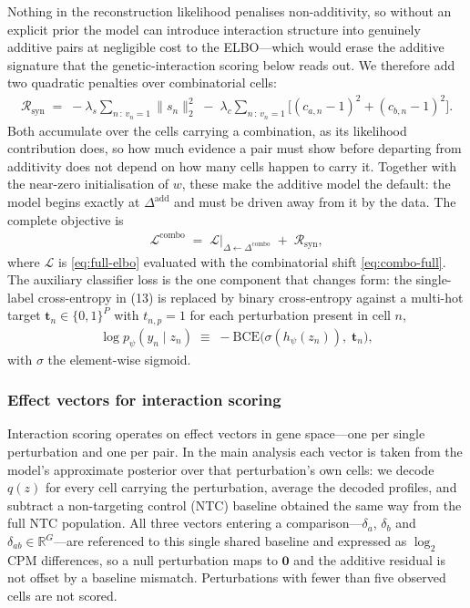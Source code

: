 Nothing in the reconstruction likelihood penalises non-additivity, so without an explicit prior the
model can introduce interaction structure into genuinely additive pairs at negligible cost to the
ELBO---which would erase the additive signature that the genetic-interaction scoring below reads
out. We therefore add two quadratic penalties over combinatorial cells:
\begin{align}
  \mathcal{R}_{\mathrm{syn}}
  \;=\;
  -\lambda_{s} \sum_{n\,:\,v_n=1} \big\| s_n \big\|_2^2
  \;-\;
  \lambda_{c} \sum_{n\,:\,v_n=1} \Big[(c_{a,n}-1)^2 + (c_{b,n}-1)^2\Big].
  \label{eq:syn-reg}
\end{align}
Both accumulate over the cells carrying a combination, as its likelihood contribution does, so how
much evidence a pair must show before departing from additivity does not depend on how many cells
happen to carry it. Together with the near-zero initialisation of $w$, these make the additive model
the default: the model begins exactly at $\Delta^{\mathrm{add}}$ and must be driven away from it by
the data. The complete objective is
\begin{align}
  \mathcal{L}^{\mathrm{combo}}
  \;=\;
  \mathcal{L}\big|_{\Delta \leftarrow \Delta^{\mathrm{combo}}}
  \;+\;
  \mathcal{R}_{\mathrm{syn}},
\end{align}
where $\mathcal{L}$ is \eqref{eq:full-elbo} evaluated with the combinatorial shift
\eqref{eq:combo-full}. The auxiliary classifier loss is the one component that changes form: the
single-label cross-entropy in (13) is replaced by binary cross-entropy against a multi-hot target
$\mathbf{t}_n \in \{0,1\}^P$ with $t_{n,p} = 1$ for each perturbation present in cell $n$,
\begin{align}
  \log p_\psi(y_n \mid z_n)
  \;\equiv\;
  -\mathrm{BCE}\big(\sigma(h_\psi(z_n)),\; \mathbf{t}_n\big),
  \label{eq:combo-ce}
\end{align}
with $\sigma$ the element-wise sigmoid.

\subsubsection{Effect vectors for interaction scoring}
\label{sec:gi-effects}

Interaction scoring operates on effect vectors in gene space---one per single perturbation and one
per pair. In the main analysis each vector is taken from the model's approximate posterior over that
perturbation's own cells: we decode $q(z)$ for every cell carrying the perturbation, average the
decoded profiles, and subtract a non-targeting control (NTC) baseline obtained the same way from the
full NTC population. All three vectors entering a comparison---$\delta_a$, $\delta_b$ and
$\delta_{ab} \in \mathbb{R}^G$---are referenced to this single shared baseline and expressed as
$\log_2$ CPM differences, so a null perturbation maps to $\mathbf{0}$ and the additive residual is
not offset by a baseline mismatch. Perturbations with fewer than five observed cells are not scored.

